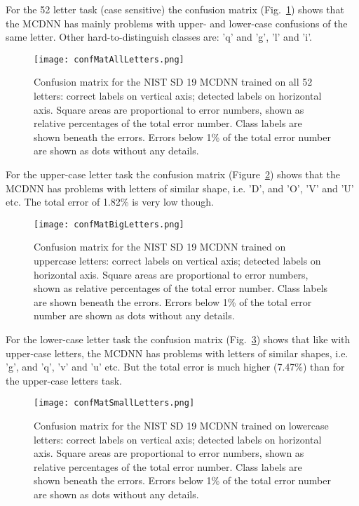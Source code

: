 \documentclass[a4paper]{article}
\begin{document}
For the 52 letter task (case sensitive) the confusion matrix (Fig.~\ref{Fig:confMatNISTAllLetters}) shows that the MCDNN has mainly problems with upper- and lower-case confusions of the same letter. Other hard-to-distinguish classes are: 'q' and 'g', 'l' and 'i'.

\begin{figure}[ht!]
\hfill
\begin{center}
\texttt{[image: confMatAllLetters.png]}
\end{center}
\caption{Confusion matrix for the NIST SD 19 MCDNN trained on all 52 letters: correct labels on vertical axis; detected labels on horizontal axis. Square areas are proportional to error numbers, shown as relative percentages of the total error number. Class labels are shown beneath the errors. Errors below 1\% of the total error number are shown as dots without any details.}
\label{Fig:confMatNISTAllLetters}
\end{figure}

For the upper-case letter task the confusion matrix (Figure~\ref{Fig:confMatNISTBigLetters}) shows that the MCDNN has problems with letters of similar shape, i.e. 'D', and 'O', 'V' and 'U' etc. The total error of 1.82\% is very low though.

\begin{figure}[ht!]
\hfill
\begin{center}
\texttt{[image: confMatBigLetters.png]}
\end{center}
\caption{Confusion matrix for the NIST SD 19 MCDNN trained on uppercase letters: correct labels on vertical axis; detected labels on horizontal axis. Square areas are proportional to error numbers, shown as relative percentages of the total error number. Class labels are shown beneath the errors. Errors below 1\% of the total error number are shown as dots without any details.}
\label{Fig:confMatNISTBigLetters}
\end{figure}

For the lower-case letter task the confusion matrix (Fig.~\ref{Fig:confMatSmallLetters}) shows that like with upper-case letters, the MCDNN has problems with letters of similar shapes, i.e. 'g', and 'q', 'v' and 'u' etc. But the total error is much higher (7.47\%) than for the upper-case letters task.

\begin{figure}[ht!]
\hfill
\begin{center}
\texttt{[image: confMatSmallLetters.png]}
\end{center}
\caption{Confusion matrix for the NIST SD 19 MCDNN trained on lowercase letters: correct labels on vertical axis; detected labels on horizontal axis. Square areas are proportional to error numbers, shown as relative percentages of the total error number. Class labels are shown beneath the errors. Errors below 1\% of the total error number are shown as dots without any details.}
\label{Fig:confMatSmallLetters}
\end{figure}
\end{document}
